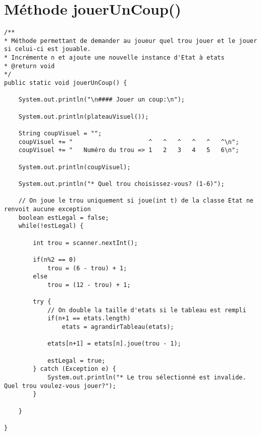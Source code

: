 \documentclass[11pt,a4paper]{report}
\begin{document}
        \newpage

    \section{Méthode jouerUnCoup()}
        \begin{lstlisting}
/**
* Méthode permettant de demander au joueur quel trou jouer et le jouer si celui-ci est jouable.
* Incrémente n et ajoute une nouvelle instance d'Etat à etats
* @return void
*/
public static void jouerUnCoup() {

    System.out.println("\n#### Jouer un coup:\n");

    System.out.println(plateauVisuel());

    String coupVisuel = "";
    coupVisuel += "                     ^   ^   ^   ^   ^   ^\n";
    coupVisuel += "   Numéro du trou => 1   2   3   4   5   6\n";

    System.out.println(coupVisuel);

    System.out.println("* Quel trou choisissez-vous? (1-6)");

    // On joue le trou uniquement si joue(int t) de la classe Etat ne renvoit aucune exception
    boolean estLegal = false;
    while(!estLegal) {

        int trou = scanner.nextInt();

        if(n%2 == 0)
            trou = (6 - trou) + 1;
        else
            trou = (12 - trou) + 1;

        try {
            // On double la taille d'etats si le tableau est rempli
            if(n+1 == etats.length)
                etats = agrandirTableau(etats);

            etats[n+1] = etats[n].joue(trou - 1);

            estLegal = true;
        } catch (Exception e) {
            System.out.println("* Le trou sélectionné est invalide. Quel trou voulez-vous jouer?");
        }

    }

}
        \end{lstlisting}

        \newpage
\end{document}
